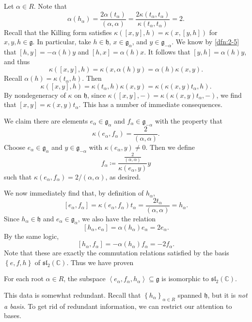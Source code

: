 \documentclass[11pt, letterpaper]{article}
\theoremstyle{plain}
\begin{document}
Let $\alpha \in R$. Note that
\[
	\alpha (h_\alpha ) = \frac{2\alpha (t_\alpha )}{(\alpha ,\alpha )} =\frac{2\kappa (t_\alpha ,t_\alpha )}{\kappa (t_\alpha ,t_\alpha )} =2
.\]
Recall that the Killing form satisfies $\kappa ([x,y],h)=\kappa (x,[y,h])$ for $x,y,h\in \mathfrak{g} $. In particular, take $h\in \mathfrak{h} $, $x\in \mathfrak{g} _\alpha $, and $y\in \mathfrak{g} _{-\alpha } $. We know by \cref{dfn:2-5} that $[h,y]=-\alpha (h)y$ and $[h,x]=\alpha (h)x$. It follows that $[y,h] = \alpha (h)y$, and thus
\[
	\kappa ([x,y],h) = \kappa (x,\alpha (h)y) = \alpha (h)\kappa (x,y)
.\]
Recall $\alpha (h) = \kappa (t_\alpha ,h)$. Then
\[
	\kappa ([x,y],h) = \kappa (t_\alpha ,h)\kappa (x,y) = \kappa (\kappa (x,y)t_\alpha ,h)
.\]
By nondegeneracy of $\kappa $ on $\mathfrak{h} $, since $\kappa ([x,y],-) = \kappa (\kappa (x,y)t_\alpha ,-)$, we find that $[x,y] = \kappa (x,y)t_\alpha $. This has a number of immediate consequences.

We claim there are elements $e_\alpha \in \mathfrak{g} _\alpha $ and $f_\alpha \in \mathfrak{g}_{-\alpha } $ with the property that
\[
	\kappa (e_\alpha ,f_\alpha ) = \frac{2}{(\alpha ,\alpha )} 
.\]
Choose $e_\alpha \in \mathfrak{g} _{\alpha } $ and $y\in \mathfrak{g} _{-\alpha } $ with $\kappa (e_\alpha ,y)\neq 0$. Then we define
\[
	f_\alpha \coloneqq \frac{\frac{2}{(\alpha ,\alpha )} }{\kappa (e_\alpha ,y)} y
\]
such that $\kappa (e_\alpha ,f_\alpha ) = 2/(\alpha ,\alpha )$, as desired.

We now immediately find that, by definition of $h_\alpha $,
\[
	[e_\alpha ,f_\alpha ] = \kappa (e_\alpha ,f_\alpha )t_\alpha =\frac{2t_\alpha }{(\alpha ,\alpha )} = h_\alpha 
.\]
Since $h_\alpha \in \mathfrak{h} $ and $e_\alpha \in \mathfrak{g} _\alpha $, we also have the relation
\[
	[h_\alpha ,e_\alpha ]=\alpha (h_\alpha )e_\alpha =2e_\alpha 
.\]
By the same logic,
\[
	[h_\alpha ,f_\alpha ] =-\alpha (h_\alpha )f_\alpha  = -2f_\alpha 
.\]
Note that these are exactly the commutation relations satisfied by the basis $\left\{ e,f,h \right\} $ of $\mathfrak{sl} _2(\mathbb{C} )$. Thus we have proven

\begin{proposition}\label{prp:2-10}
	For each root $\alpha \in R$, the subspace $\left\langle e_\alpha ,f_\alpha ,h_\alpha  \right\rangle \subseteq \mathfrak{g} $ is isomorphic to $\mathfrak{sl} _2(\mathbb{C} )$.
\end{proposition}

This data is somewhat redundant. Recall that $\left\{ h_\alpha  \right\}_{\alpha \in R} $ spanned $\mathfrak{h} $, but it is \emph{not a basis}. To get rid of redundant information, we can restrict our attention to bases.
\end{document}
